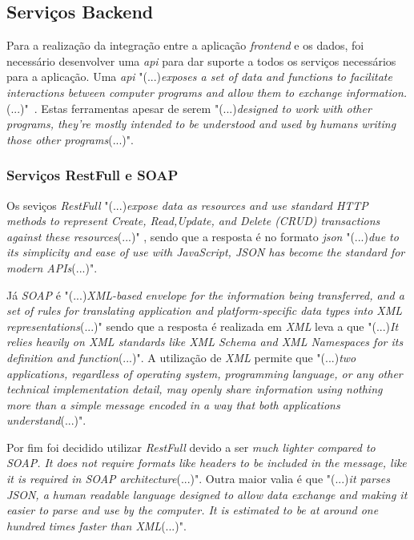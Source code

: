 \subsection{Serviços Backend}

Para a realização da integração entre a aplicação \emph{frontend} e os dados, foi necessário desenvolver uma \textit{\acrfull{api}} para dar suporte a todos os serviços necessários para a aplicação.
Uma \textit{\acrshort{api}} "(...)\emph{exposes a set of data and functions to facilitate interactions between computer programs and allow them to exchange information.}(...)"~\citep{rest_cookbook}.
Estas ferramentas apesar de serem "(...)\emph{designed to work with other programs, they’re mostly intended to be understood and used by humans writing those other programs}(...)"\citep{api_design}.

\subsubsection{Serviços RestFull e SOAP}
Os seviços \emph{RestFull} "(...)\emph{expose data as resources and use standard HTTP methods to represent Create, Read,Update, and Delete (CRUD) transactions against these resources}(...)"
\citep{api_design}, sendo que a resposta é no formato \textit{\acrfull{json}} "(...)\emph{due to its simplicity and ease of use with JavaScript, JSON has become the standard for modern APIs}(...)"\citep{api_design}.

Já \emph{SOAP} é "(...)\emph{XML-based envelope for the information being transferred, and a set of rules for translating application and platform-specific data types into XML representations}(...)"\citep{Snell2002} sendo que a resposta é realizada em \emph{XML} leva a que "(...)\emph{It relies heavily on XML standards like XML Schema and XML Namespaces for its definition and function}(...)"\citep{Snell2002}. A utilização de \emph{XML} permite que "(...)\emph{two applications, regardless of operating system, programming language, or any other technical implementation detail, may openly share information using nothing more than a simple message encoded in a way that both applications understand}(...)"\citep{Snell2002}.

Por fim foi decidido utilizar \emph{RestFull} devido a ser \emph{much lighter compared to SOAP. It does not require formats like headers to be included in the message, like it is required in SOAP architecture}(...)"\citep{Halili2018}. Outra maior valia é que "(...)\emph{it parses JSON, a human readable language designed to allow data exchange and making it easier to parse and use by the computer. It is estimated to be at around one hundred times faster than XML}(...)"\citep{Halili2018}.

